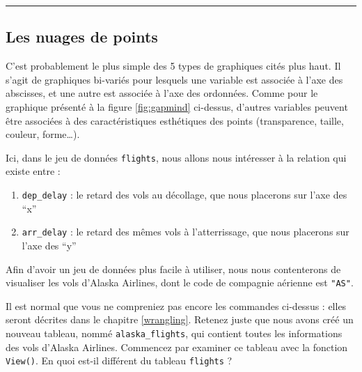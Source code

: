 \documentclass[
  a4paper,
]{article}
\newenvironment{Shaded}{\begin{snugshade}}{\end{snugshade}}
\newcommand{\KeywordTok}[1]{\textcolor[rgb]{0.12,0.11,0.11}{\textbf{#1}}}
\newcommand{\NormalTok}[1]{\textcolor[rgb]{0.12,0.11,0.11}{#1}}
\newcommand{\OperatorTok}[1]{\textcolor[rgb]{0.12,0.11,0.11}{#1}}
\newcommand{\StringTok}[1]{\textcolor[rgb]{0.75,0.01,0.01}{#1}}
\providecommand{\tightlist}{%
  \setlength{\itemsep}{0pt}\setlength{\parskip}{0pt}}
\begin{document}
\begin{center}\rule{0.5\linewidth}{0.5pt}\end{center}

\hypertarget{clouds}{%
\subsection{Les nuages de points}\label{clouds}}

C'est probablement le plus simple des 5 types de graphiques cités plus haut. Il s'agit de graphiques bi-variés pour lesquels une variable est associée à l'axe des abscisses, et une autre est associée à l'axe des ordonnées. Comme pour le graphique présenté à la figure \ref{fig:gapmind} ci-dessus, d'autres variables peuvent être associées à des caractéristiques esthétiques des points (transparence, taille, couleur, forme\ldots).

Ici, dans le jeu de données \texttt{flights}, nous allons nous intéresser à la relation qui existe entre :

\begin{enumerate}
\def\labelenumi{\arabic{enumi}.}
\tightlist
\item
  \texttt{dep\_delay} : le retard des vols au décollage, que nous placerons sur l'axe des ``x''
\item
  \texttt{arr\_delay} : le retard des mêmes vols à l'atterrissage, que nous placerons sur l'axe des ``y''
\end{enumerate}

Afin d'avoir un jeu de données plus facile à utiliser, nous nous contenterons de visualiser les vols d'Alaska Airlines, dont le code de compagnie aérienne est \texttt{"AS"}.

\begin{Shaded}
\end{Shaded}

Il est normal que vous ne compreniez pas encore les commandes ci-dessus : elles seront décrites dans le chapitre \ref{wrangling}. Retenez juste que nous avons créé un nouveau tableau, nommé \texttt{alaska\_flights}, qui contient toutes les informations des vols d'Alaska Airlines. Commencez par examiner ce tableau avec la fonction \texttt{View()}. En quoi est-il différent du tableau \texttt{flights} ?
\end{document}
